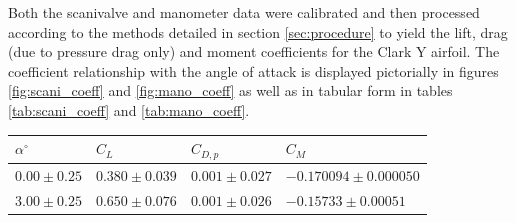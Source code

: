 \documentclass[runningheads]{llncs}
\begin{document}
Both the scanivalve and manometer data were calibrated and then processed according to the methods detailed in section \ref{sec:procedure} to yield the lift, drag (due to pressure drag only) and  moment coefficients for the Clark Y airfoil. The coefficient relationship with the angle of attack is displayed pictorially in figures \ref{fig:scani_coeff} and \ref{fig:mano_coeff} as well as in tabular form in tables \ref{tab:scani_coeff} and \ref{tab:mano_coeff}.\newline

\begin{table}[h]
\centering
\begin{tabular}{p{3cm}p{3cm}p{3cm}p{3cm}}
\toprule
$\alpha^\circ$ &                   $C_L$ &               $C_{D,p}$ &                    $C_M$ \\
\midrule
 $0.00\pm0.25$ & $0.380\pm0.039$ & $0.001\pm0.027$ &  $-0.170094\pm0.000050$ \\
 $3.00\pm0.25$ & $0.650\pm0.076$ & $0.001\pm0.026$ & $-0.15733\pm0.00051$ \\

\end{tabular}
\end{table}
\end{document}
